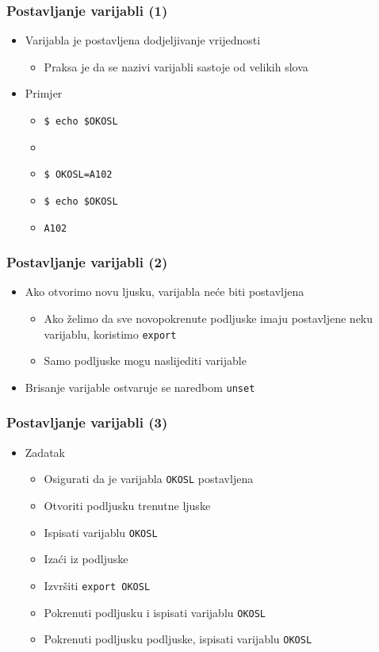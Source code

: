 \documentclass[table,usenames,dvipsnames]{beamer}
\newcommand{\shell}[1]{\texttt{#1}}
\begin{document}
\begin{frame}[t]
\frametitle{Postavljanje varijabli (1)}
\begin{itemize}
  \item Varijabla je postavljena dodjeljivanje vrijednosti
  \begin{itemize}
    \item Praksa je da se nazivi varijabli sastoje od velikih slova
  \end{itemize}
  \item Primjer
  \begin{itemize}
    \item[] \shell{\$ echo \$OKOSL}
    \item[] 
    \item[] \shell{\$ OKOSL=A102}
    \item[] \shell{\$ echo \$OKOSL}
    \item[] \shell{A102}
  \end{itemize}
\end{itemize}
\end{frame}

\begin{frame}[t]
\frametitle{Postavljanje varijabli (2)}
\begin{itemize}
  \item Ako otvorimo novu ljusku, varijabla neće biti postavljena
  \begin{itemize}
    \item Ako želimo da sve novopokrenute podljuske imaju postavljene neku
      varijablu, koristimo \shell{export}
    \item Samo podljuske mogu naslijediti varijable
  \end{itemize}
  \item Brisanje varijable ostvaruje se naredbom \shell{unset}
\end{itemize}
\end{frame}

\begin{frame}[t]
\frametitle{Postavljanje varijabli (3)}
\begin{itemize}
  \item Zadatak
  \begin{itemize}
    \item Osigurati da je varijabla \shell{OKOSL} postavljena
    \item Otvoriti podljusku trenutne ljuske
    \item Ispisati varijablu \shell{OKOSL}
    \item Izaći iz podljuske
    \item Izvršiti \shell{export OKOSL}
    \item Pokrenuti podljusku i ispisati varijablu \shell{OKOSL}
    \item Pokrenuti podljusku podljuske, ispisati varijablu \shell{OKOSL}
  \end{itemize}
\end{itemize}
\end{frame}
\end{document}
